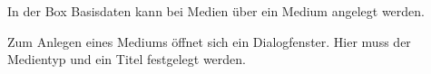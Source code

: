 \documentclass[parskip=off,index=totocnumbered]{scrartcl}
\newenvironment{rückkeinstück}
	{\begin{adjustwidth}{0cm}{0cm}\footnotesize \singlespace \centering} 
	{\end{adjustwidth} \onehalfspacing}
\newenvironment{rückkeinstück2}
	{\begin{adjustwidth}{0cm}{0cm}\footnotesize \singlespace} 
	{\end{adjustwidth} \onehalfspacing}
\begin{document}
\noindent \begin{minipage}{\textwidth}
    \vspace{0.6cm}
    \begin{rückkeinstück}
        In der Box \textsf{Basisdaten} kann bei \textsf{Medien} über \add ein Medium angelegt werden.
        \vspace{0.6cm}
    \end{rückkeinstück}
\end{minipage}
              
\noindent \begin{minipage}{\textwidth}
    \begin{rückkeinstück2}
        Zum Anlegen eines Mediums öffnet sich ein Dialogfenster. Hier muss der Medientyp und ein Titel festgelegt werden.
    \end{rückkeinstück2}
\end{minipage}
              
\end{document}
